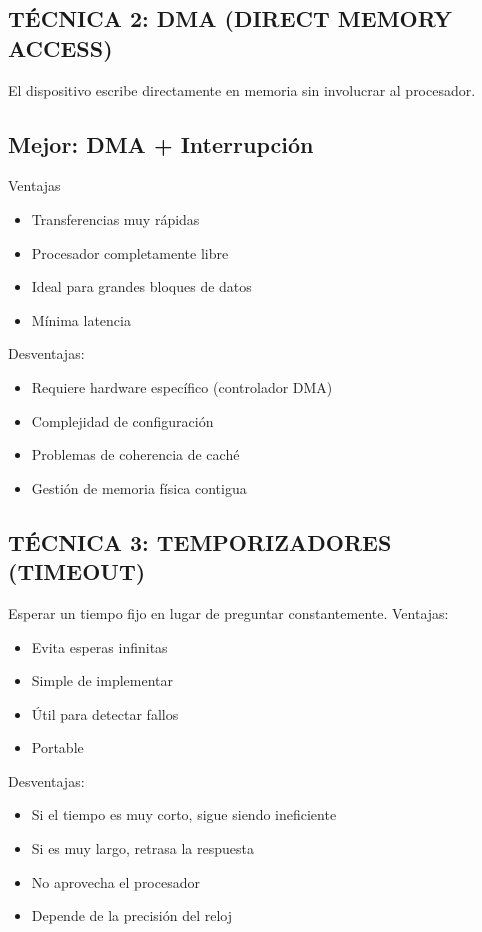 \documentclass{article}
\begin{document}
\subsection{TÉCNICA 2: DMA (DIRECT MEMORY ACCESS)}
El dispositivo escribe directamente en memoria sin involucrar al procesador.
\subsection{Mejor: DMA + Interrupción}
Ventajas
\begin{itemize}
    \item Transferencias muy rápidas
    \item  Procesador completamente libre
    \item Ideal para grandes bloques de datos
    \item Mínima latencia
\end{itemize}
Desventajas:
\begin{itemize}
    \item Requiere hardware específico (controlador DMA)
    \item Complejidad de configuración
    \item Problemas de coherencia de caché
    \item Gestión de memoria física contigua
\end{itemize}
\subsection{TÉCNICA 3: TEMPORIZADORES (TIMEOUT)}
Esperar un tiempo fijo en lugar de preguntar constantemente.
Ventajas:
\begin{itemize}
    \item  Evita esperas infinitas
    \item  Simple de implementar
    \item Útil para detectar fallos
    \item  Portable
\end{itemize}
Desventajas:
\begin{itemize}
    \item Si el tiempo es muy corto, sigue siendo ineficiente
    \item Si es muy largo, retrasa la respuesta
    \item No aprovecha el procesador
    \item  Depende de la precisión del reloj
\end{itemize}
\end{document}
